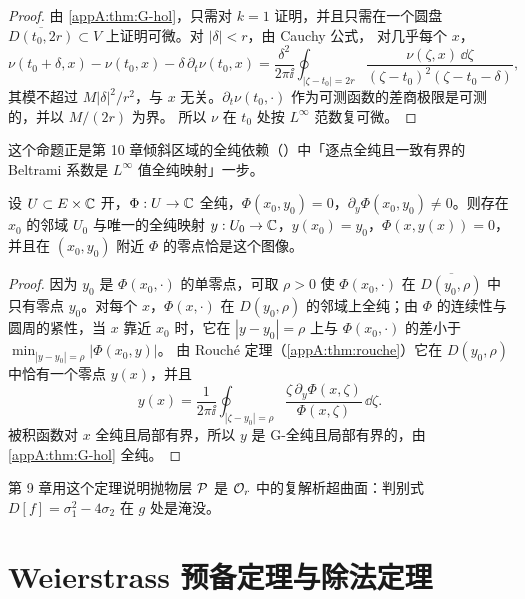 \begin{proof}
由 \cref{appA:thm:G-hol}，只需对 $k=1$ 证明，并且只需在一个圆盘 $\overline{D(t_0,2r)}\subset V$ 上证明可微。对 $|\delta|<r$，由 Cauchy 公式，
对几乎每个 $x$，
\[
  \nu(t_0+\delta,x)-\nu(t_0,x)-\delta\,\partial_t\nu(t_0,x)
  =\frac{\delta^2}{2\pi\ii}\oint_{|\zeta-t_0|=2r}\frac{\nu(\zeta,x)\,\dd\zeta}{(\zeta-t_0)^2(\zeta-t_0-\delta)} ,
\]
其模不超过 $M|\delta|^2/r^2$，与 $x$ 无关。$\partial_t\nu(t_0,\cdot)$ 作为可测函数的差商极限是可测的，并以 $M/(2r)$ 为界。
所以 $\nu$ 在 $t_0$ 处按 $L^\infty$ 范数复可微。
\end{proof}

这个命题正是第 10 章倾斜区域的全纯依赖（\cite[命题~10.9]{KneserPaper}）中「逐点全纯且一致有界的 Beltrami 系数是 $L^\infty$ 值全纯映射」一步。

\begin{theorem}\label{appA:thm:implicit}
设 $U\subset E\times\mathbb{C}$ 开，$\Phi:U\to\mathbb{C}$ 全纯，$\Phi(x_0,y_0)=0$，$\partial_y\Phi(x_0,y_0)\neq0$。则存在 $x_0$ 的邻域 $U_0$ 与唯一的全纯映射
$y:U_0\to\mathbb{C}$，$y(x_0)=y_0$，$\Phi(x,y(x))=0$，并且在 $(x_0,y_0)$ 附近 $\Phi$ 的零点恰是这个图像。
\end{theorem}

\begin{proof}
因为 $y_0$ 是 $\Phi(x_0,\cdot)$ 的单零点，可取 $\rho>0$ 使 $\Phi(x_0,\cdot)$ 在 $\overline{D(y_0,\rho)}$ 中只有零点 $y_0$。对每个 $x$，$\Phi(x,\cdot)$ 在 $D(y_0,\rho)$ 的邻域上全纯；由 $\Phi$ 的连续性与圆周的紧性，当 $x$ 靠近 $x_0$ 时，它在 $|y-y_0|=\rho$ 上与 $\Phi(x_0,\cdot)$ 的差小于 $\min_{|y-y_0|=\rho}|\Phi(x_0,y)|$。
由 Rouché 定理（\cref{appA:thm:rouche}）它在 $D(y_0,\rho)$ 中恰有一个零点 $y(x)$，并且
\[
  y(x)=\frac1{2\pi\ii}\oint_{|\zeta-y_0|=\rho}\frac{\zeta\,\partial_y\Phi(x,\zeta)}{\Phi(x,\zeta)}\,\dd\zeta .
\]
被积函数对 $x$ 全纯且局部有界，所以 $y$ 是 G-全纯且局部有界的，由 \cref{appA:thm:G-hol} 全纯。
\end{proof}

第 9 章用这个定理说明抛物层 $\mathcal P$ 是 $\mathcal O_r$ 中的复解析超曲面：判别式 $D[f]=\sigma_1^2-4\sigma_2$ 在 $g$ 处是淹没。

\section{Weierstrass 预备定理与除法定理}\label{appA:sec:weierstrass}

